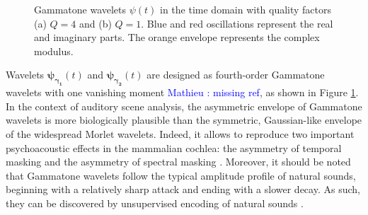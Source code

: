 \documentclass[journal]{IEEEtran}
\newcommand{\ml}[1]{\textcolor{blue}{ Mathieu : #1}}
\begin{document}
\begin{figure}
\begin{center}
\caption{
\label{fig:gammatones}
Gammatone wavelets $\psi(t)$ in the time domain with quality factors (a) $Q = 4$ and (b) $Q = 1$. Blue and red oscillations represent the real and imaginary parts. The orange envelope represents the complex modulus.}
\end{center}
\end{figure}

Wavelets
$\boldsymbol{\psi_{\gamma_1}}(t)$ and $\boldsymbol{\psi_{\gamma_2}}(t)$ are designed as fourth-order Gammatone
wavelets with one vanishing moment \cite{Venkitaraman2014} \ml{missing ref}, as shown in Figure \ref{fig:gammatones}.
In the context of auditory scene analysis, the asymmetric envelope of Gammatone wavelets is more biologically plausible than the symmetric, Gaussian-like envelope of the widespread Morlet wavelets.
Indeed, it allows to reproduce two important psychoacoustic effects in the mammalian cochlea: the asymmetry of temporal masking and the asymmetry of spectral masking \cite{Fastl2007}.
Moreover, it should be noted that Gammatone wavelets follow the typical amplitude profile of natural sounds, beginning with a relatively sharp attack and ending with a slower decay.
As such, they can be discovered by unsupervised encoding of natural sounds \cite{Smith2006}.
\end{document}
